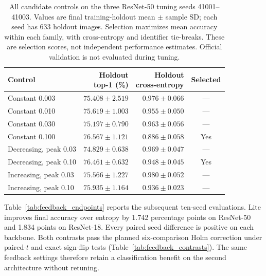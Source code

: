 \documentclass[10pt,a4paper,twocolumn]{article}
\begin{document}
\begin{table}[tbp]
\caption{All candidate controls on the three ResNet-50 tuning seeds
41001--41003. Values are final training-holdout mean $\pm$ sample SD;
each seed has 633 holdout images. Selection maximizes mean accuracy
within each family, with cross-entropy and identifier tie-breaks.
These are selection scores, not independent performance estimates.
Official validation is not evaluated during tuning.}
\label{tab:tuning_candidates}
\centering\footnotesize
\begin{tabular*}{\linewidth}{@{\extracolsep{\fill}}lrrc@{}}
\toprule
Control & \shortstack{Holdout\\top-1 (\%)} & \shortstack{Holdout\\cross-entropy} & Selected \\
\midrule
Constant 0.003 & $75.408\pm2.519$ & $0.976\pm0.066$ & --- \\
Constant 0.010 & $75.619\pm1.003$ & $0.955\pm0.050$ & --- \\
Constant 0.030 & $75.197\pm0.790$ & $0.963\pm0.056$ & --- \\
Constant 0.100 & $76.567\pm1.121$ & $0.886\pm0.058$ & Yes \\
\midrule
Decreasing, peak 0.03 & $74.829\pm0.638$ & $0.969\pm0.047$ & --- \\
Decreasing, peak 0.10 & $76.461\pm0.632$ & $0.948\pm0.045$ & Yes \\
Increasing, peak 0.03 & $75.566\pm1.227$ & $0.980\pm0.052$ & --- \\
Increasing, peak 0.10 & $75.935\pm1.164$ & $0.936\pm0.023$ & --- \\
\bottomrule
\end{tabular*}
\end{table}


Table~\ref{tab:feedback_endpoints} reports the subsequent ten-seed
evaluations. Lite improves final accuracy over entropy by 1.742
percentage points on ResNet-50 and 1.834 points on ResNet-18. Every
paired seed difference is positive on each backbone. Both contrasts
pass the planned six-comparison Holm correction under paired-$t$ and
exact sign-flip tests (Table~\ref{tab:feedback_contrasts}). The same
feedback settings therefore retain a classification benefit on the
second architecture without retuning.
\end{document}
